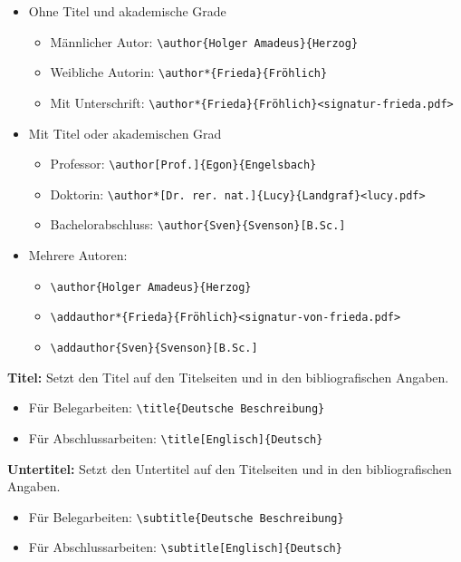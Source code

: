 	\begin{itemize}
		\item Ohne Titel und akademische Grade
		\begin{itemize}
			\item Männlicher Autor: \verb|\author{Holger Amadeus}{Herzog}|
			\item Weibliche Autorin: \verb|\author*{Frieda}{Fröhlich}|
			\item Mit Unterschrift: \verb|\author*{Frieda}{Fröhlich}<signatur-frieda.pdf>|
		\end{itemize}
		\item Mit Titel oder akademischen Grad
		\begin{itemize}
			\item Professor: \verb|\author[Prof.]{Egon}{Engelsbach}|
			\item Doktorin: \verb|\author*[Dr. rer. nat.]{Lucy}{Landgraf}<lucy.pdf>|
			\item Bachelorabschluss: \verb|\author{Sven}{Svenson}[B.Sc.]|
		\end{itemize}
		\item Mehrere Autoren:
		\begin{itemize}
			\item \verb|\author{Holger Amadeus}{Herzog}|
			\item \verb|\addauthor*{Frieda}{Fröhlich}<signatur-von-frieda.pdf>|
			\item \verb|\addauthor{Sven}{Svenson}[B.Sc.]|
		\end{itemize}
	\end{itemize}


\textbf{Titel:}\label{cmd:title}
Setzt den Titel auf den Titelseiten und in den bibliografischen Angaben.
\begin{itemize}
	\item Für Belegarbeiten: \verb|\title{Deutsche Beschreibung}|
	\item Für Abschlussarbeiten: \verb|\title[Englisch]{Deutsch}|
\end{itemize}
	
	\textbf{Untertitel:}\label{cmd:subtitle}
	Setzt den Untertitel auf den Titelseiten und in den bibliografischen Angaben.
	\begin{itemize}
		\item Für Belegarbeiten: \verb|\subtitle{Deutsche Beschreibung}|
		\item Für Abschlussarbeiten: \verb|\subtitle[Englisch]{Deutsch}|
	\end{itemize}
	
